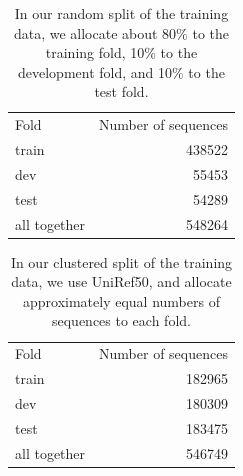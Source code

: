 \begin{table}[htbp]
  \centering
  \begin{tabular}{|l|r|}
  \hline
           Fold &  Number of sequences \\
  \Xhline{2pt}
          train &               438522 \\
  \hline
            dev &               55453 \\
  \hline
           test &               54289 \\
  \hline
   all together &               548264 \\
  \hline
  \end{tabular}
  \caption{In our random split of the training data, we allocate about 80\% to the training fold, 10\% to the development fold, and 10\% to the test fold.}
  \end{table}
  \begin{table}[htbp]
  \centering
  \begin{tabular}{|l|r|}
  \hline
           Fold &  Number of sequences \\
  \Xhline{2pt}
          train &               182965 \\
  \hline
            dev &               180309 \\
  \hline
           test &               183475 \\
  \hline
   all together &               546749 \\
  \hline
  \end{tabular}
  \caption{In our clustered split of the training data, we use UniRef50, and allocate approximately equal numbers of sequences to each fold.}
  
  \end{table}

